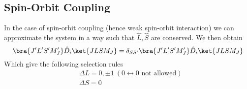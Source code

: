 \documentclass[a4paper, 11pt]{book}
\newcommand{\1}{\opr{\mathds{1}}}
\newcommand{\opr}[1]{\hat{#1}}
\theoremstyle{plain}
\begin{document}
	\subsection{Spin-Orbit Coupling}
	In the case of spin-orbit coupling (hence weak spin-orbit interaction) we can approximate the system in a way such that $\opr{L},\opr{S}$ are conserved. We then obtain
	\begin{equation}
		\bra{J'L'S'M_J'}\opr{D}_i\ket{JLSM_J}=\delta_{SS'}\bra{J'L'S'M_J'}\opr{D}_i\ket{JLSM_J}
		\label{eq:matrixelementDmanyelec}
	\end{equation}
	Which give the following selection rules
	\begin{equation}
		\begin{aligned}
			&\boxed{\boxed{\Delta L=0,\pm1}}\ (0\leftrightarrow0\text{ not allowed})\\
			&\boxed{\boxed{\Delta S=0}}
		\end{aligned}
		\label{eq:LSselectionrules}
	\end{equation}
\end{document}
